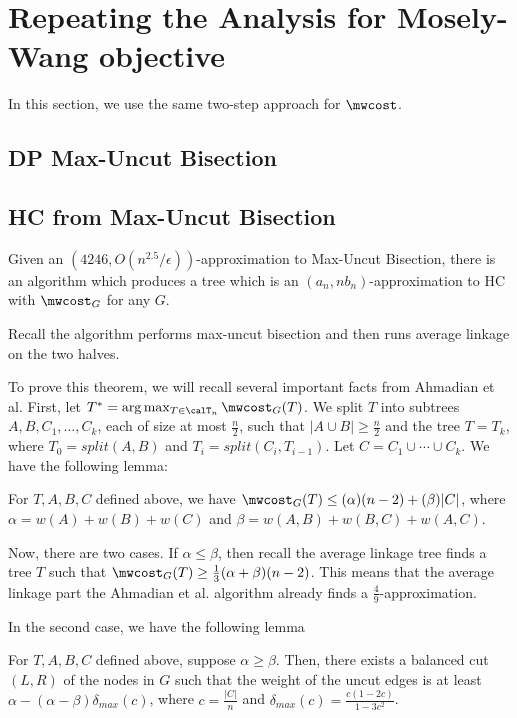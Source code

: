 \section{Repeating the Analysis for Mosely-Wang objective}
In this section, we use the same two-step approach for $\mwcost$. 

\subsection{DP Max-Uncut Bisection}

\subsection{HC from Max-Uncut Bisection}
\begin{thm}
Given an $(4246, O(n^{2.5}/\epsilon))$-approximation to Max-Uncut Bisection, there is an algorithm which produces a tree which is an $(a_n, n b_n)$-approximation to HC with $\mwcost_G$ for any $G$.
\end{thm}
Recall the algorithm performs max-uncut bisection and then runs average linkage on the two halves.

To prove this theorem, we will recall several important facts from Ahmadian et al.
First, let $T^* = \arg \max_{T \in \calT_n} \mwcost_G(T)$. We split $T$ into subtrees $A, B, C_1, \ldots, C_k$, each of size at most $\frac{n}{2}$, such that $|A \cup B| \geq \frac{n}{2}$ and the tree $T = T_k$, where $T_0 = split(A, B)$ and $T_i = split(C_i, T_{i-1})$. Let $C = C_1 \cup \cdots \cup C_k$. We have the following lemma:

\begin{lem}
    For $T,A,B,C$ defined above, we have $\mwcost_G(T) \leq (\alpha) (n-2) + (\beta) |C|$, where $\alpha = w(A) + w(B) + w(C)$ and $\beta = w(A, B) + w(B,C) + w(A,C)$.
\end{lem}
Now, there are two cases. If $\alpha \leq \beta$, then recall the average linkage tree finds a tree $T$ such that $\mwcost_G(T) \geq \frac{1}{3}(\alpha + \beta)(n-2)$. This means that the average linkage part the Ahmadian et al. algorithm already finds a $\frac{4}{9}$-approximation. 

In the second case, we have the following lemma
\begin{lem}
    For $T, A, B, C$ defined above, suppose $\alpha \geq \beta$. Then, there exists a balanced cut $(L,R)$ of the nodes in $G$ such that the weight of the uncut edges is at least $\alpha - (\alpha-\beta) \delta_{max}(c)$, where $c = \frac{|C|}{n}$ and $\delta_{max}(c) = \frac{c(1-2c)}{1-3c^2}$.
\end{lem}

